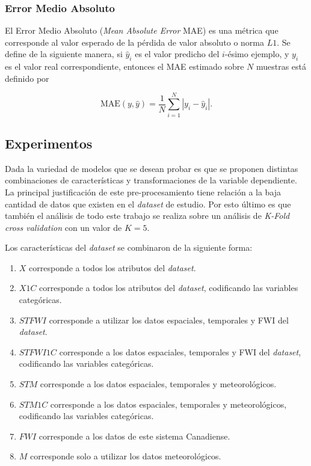 \documentclass[spanish]{article}
\begin{document}
          
        \subsubsection{Error Medio Absoluto}
        
          El Error Medio Absoluto (\emph{Mean Absolute Error} MAE) es una métrica que corresponde al valor 
          esperado de la pérdida de valor absoluto o norma $L1$. Se define de la siguiente manera, si 
          $\hat{y}_i$ es el valor predicho del $i$-ésimo ejemplo, y $y_i$ es el valor real correspondiente, 
          entonces el MAE estimado sobre $N$ muestras está definido por
          
          \begin{equation}
            \text{MAE}(y, \hat{y}) = \frac{1}{N} \sum_{i=1}^{N} \left| y_i - \hat{y}_i \right|.
          \end{equation}

  
      \subsection{Experimentos}
      
        Dada la variedad de modelos que se desean probar es que se proponen distintas combinaciones de 
        características y transformaciones de la variable dependiente. La principal justificación de este 
        pre-procesamiento tiene relación a la baja cantidad de datos que existen en el \emph{dataset} de 
        estudio. Por esto último es que también el análisis de todo este trabajo se realiza sobre un 
        análisis de \emph{K-Fold cross validation} con un valor de $K=5$. \medskip
        
        Los características del \emph{dataset} se combinaron de la siguiente forma:
        \begin{enumerate}
          \item $X$ corresponde a todos los atributos del \emph{dataset}.
          \item $X1C$ corresponde a todos los atributos del \emph{dataset}, codificando las variables 
            categóricas.
          \item $STFWI$ corresponde a utilizar los datos espaciales, temporales y FWI del \emph{dataset}.
          \item $STFWI1C$ corresponde a los datos espaciales, temporales y FWI del \emph{dataset}, 
            codificando las variables categóricas.
          \item $STM$ corresponde a los datos espaciales, temporales y meteorológicos.
          \item $STM1C$ corresponde a los datos espaciales, temporales y meteorológicos, codificando las 
            variables categóricas.
          \item $FWI$ corresponde a los datos de este sistema Canadiense.
          \item $M$ corresponde solo a utilizar los datos meteorológicos.
        \end{enumerate}
        
\end{document}
